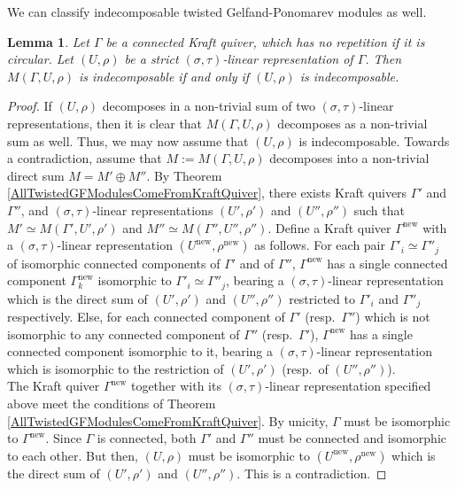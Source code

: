 \documentclass[12pt]{amsart}
\newtheorem{lemma}[theorem]{Lemma}
\theoremstyle{definition}
\newcommand{\<}{\langle}   %
\renewcommand{\>}{\rangle} %
\begin{document}
We can classify indecomposable twisted Gelfand-Ponomarev modules as well. 

\begin{lemma}\label{LemmaIndecomposableModules}
    Let $\Gamma$ be a connected Kraft quiver, which has no repetition if it is circular. Let $(U,\rho)$ be a strict $(\sigma,\tau)$-linear representation of $\Gamma$. Then $M(\Gamma,U,\rho)$ is indecomposable if and only if $(U,\rho)$ is indecomposable.
\end{lemma}

\begin{proof}
    If $(U,\rho)$ decomposes in a non-trivial sum of two $(\sigma,\tau)$-linear representations, then it is clear that $M(\Gamma,U,\rho)$ decomposes as a non-trivial sum as well. Thus, we may now assume that $(U,\rho)$ is indecomposable. Towards a contradiction, assume that $M := M(\Gamma,U,\rho)$ decomposes into a non-trivial direct sum $M = M' \oplus M''$. By Theorem \ref{AllTwistedGFModulesComeFromKraftQuiver}, there exists Kraft quivers $\Gamma'$ and $\Gamma''$, and $(\sigma,\tau)$-linear representations $(U',\rho')$ and $(U'',\rho'')$ such that $M' \simeq M(\Gamma',U',\rho')$ and $M'' \simeq M(\Gamma'',U'',\rho'')$. Define a Kraft quiver $\Gamma^{\mathrm{new}}$ with a $(\sigma,\tau)$-linear representation $(U^{\mathrm{new}},\rho^{\mathrm{new}})$ as follows. For each pair $\Gamma'_i \simeq \Gamma''_j$ of isomorphic connected components of $\Gamma'$ and of $\Gamma''$, $\Gamma^{\mathrm{new}}$ has a single connected component $\Gamma^{\mathrm{new}}_k$ isomorphic to $\Gamma'_i \simeq \Gamma''_j$, bearing a $(\sigma,\tau)$-linear representation which is the direct sum of $( U',\rho')$ and $(U'',\rho'')$ restricted to $\Gamma'_i$ and $\Gamma''_j$ respectively. Else, for each connected component of $\Gamma'$ (resp.~$\Gamma''$) which is not isomorphic to any connected component of $\Gamma''$ (resp.~$\Gamma'$), $\Gamma^{\mathrm{new}}$ has a single connected component isomorphic to it, bearing a $(\sigma,\tau)$-linear representation which is isomorphic to the restriction of $(U',\rho')$ (resp.~of $(U'',\rho'')$).\\
    The Kraft quiver $\Gamma^{\mathrm{new}}$ together with its $(\sigma,\tau)$-linear representation specified above meet the conditions of Theorem \ref{AllTwistedGFModulesComeFromKraftQuiver}. By unicity, $\Gamma$ must be isomorphic to $\Gamma^{\mathrm{new}}$. Since $\Gamma$ is connected, both $\Gamma'$ and $\Gamma''$ must be connected and isomorphic to each other. But then, $(U,\rho)$ must be isomorphic to $(U^{\mathrm{new}},\rho^{\mathrm{new}})$ which is the direct sum of $(U',\rho')$ and $(U'',\rho'')$. This is a contradiction.
\end{proof}
\end{document}
